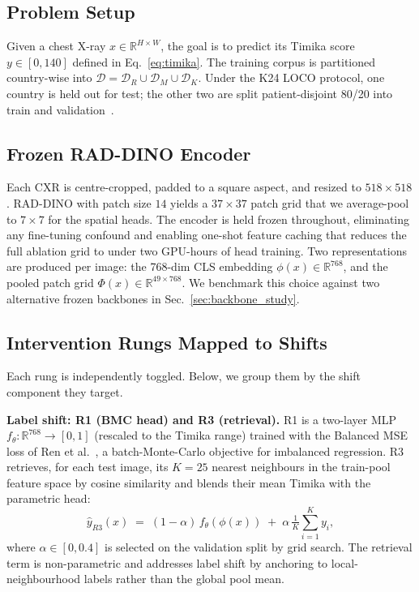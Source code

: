\documentclass[runningheads]{llncs}
\begin{document}
\subsection{Problem Setup}

Given a chest X-ray $x \in \mathbb{R}^{H\times W}$, the goal is to predict its Timika score $y \in [0,140]$ defined in Eq.~\ref{eq:timika}. The training corpus is partitioned country-wise into $\mathcal{D} = \mathcal{D}_R \cup \mathcal{D}_M \cup \mathcal{D}_K$. Under the K24 LOCO protocol, one country is held out for test; the other two are split patient-disjoint 80/20 into train and validation~\cite{kantipudi2024}.

\subsection{Frozen RAD-DINO Encoder}

Each CXR is centre-cropped, padded to a square aspect, and resized to $518\times 518$. RAD-DINO with patch size $14$ yields a $37\times 37$ patch grid that we average-pool to $7\times 7$ for the spatial heads. The encoder is held frozen throughout, eliminating any fine-tuning confound and enabling one-shot feature caching that reduces the full ablation grid to under two GPU-hours of head training. Two representations are produced per image: the 768-dim CLS embedding $\phi(x) \in \mathbb{R}^{768}$, and the pooled patch grid $\Phi(x) \in \mathbb{R}^{49\times 768}$. We benchmark this choice against two alternative frozen backbones in Sec.~\ref{sec:backbone_study}.

\subsection{Intervention Rungs Mapped to Shifts}

Each rung is independently toggled. Below, we group them by the shift component they target.

\smallskip\noindent\textbf{Label shift: R1 (BMC head) and R3 (retrieval).}
R1 is a two-layer MLP $f_\theta : \mathbb{R}^{768} \to [0,1]$ (rescaled to the Timika range) trained with the Balanced MSE loss of Ren et al.~\cite{ren2022bmc}, a batch-Monte-Carlo objective for imbalanced regression. R3 retrieves, for each test image, its $K{=}25$ nearest neighbours in the train-pool feature space by cosine similarity and blends their mean Timika with the parametric head:
\begin{equation}
\hat{y}_{R3}(x) \;=\; (1-\alpha)\,f_\theta(\phi(x)) \;+\; \alpha\,\tfrac{1}{K}\!\sum_{i=1}^{K} y_i,
\label{eq:retrieval}
\end{equation}
where $\alpha\in[0,0.4]$ is selected on the validation split by grid search. The retrieval term is non-parametric and addresses label shift by anchoring to local-neighbourhood labels rather than the global pool mean.
\end{document}
